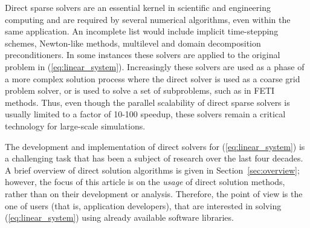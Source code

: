 \documentclass[acmtoms,acmnow]{acmtrans2m}
\begin{document}
Direct sparse solvers are an essential kernel in scientific and
engineering computing and are required by several numerical
algorithms, even within the same application. An incomplete list
would include implicit time-stepping schemes, Newton-like methods,
multilevel and domain decomposition preconditioners. In some
instances these solvers are applied to the original problem in
(\ref{eq:linear_system}). Increasingly these solvers are used as a
phase of a more complex solution process where the direct solver is
used as a coarse grid problem solver, or is used to solve a set of
subproblems, such as in FETI~\cite{FETI} methods.  Thus, even though
the parallel scalability of direct sparse solvers is usually limited
to a factor of 10-100 speedup, these solvers remain a critical
technology for large-scale simulations.

The development and implementation of
direct solvers for (\ref{eq:linear_system}) is a
challenging task that has been a subject of research over the
last four decades.
A brief overview of direct solution algorithms  is given in
Section~\ref{sec:overview}; however,
the focus of this article is on the {\sl usage} of direct solution methods,
    rather than on their development or analysis.
Therefore, the point of view is the one of users (that is, application
                                                  developers),
that are interested in solving
(\ref{eq:linear_system}) using already available software libraries.

\smallskip
\end{document}
